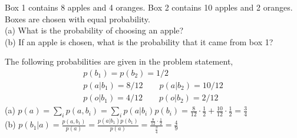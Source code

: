\documentclass[a4paper]{article}
\begin{document}
\begin{ExerciseList}





\Exercise[label={ex:apples-oranges}] Box 1 contains 8 apples and 4 oranges. Box 2 contains 10 apples
and 2 oranges. Boxes are chosen with equal probability.\\
(a) What is the probability of choosing an
apple?\\
(b) If an apple is chosen, what is the probability that it came from box 1?

\Answer[ref={ex:apples-oranges}] The following probabilities are given in the problem statement,
\begin{gather*}
p(b_1)=p(b_2)=1/2\\
p(a|b_1) = 8/12 \qquad p(a|b_2)=10/12\\
p(o|b_1) = 4/12 \qquad p(o|b_2)=2/12
\end{gather*}
(a) $p(a) = \sum_i p(a,b_i) = \sum_i p(a|b_i)p(b_i)=\frac{8}{12}\cdot\frac{1}{2} + \frac{10}{12}\cdot\frac{1}{2} = \frac{3}{4}$\\
(b) $p(b_1|a) = \frac{p(a,b_1)}{p(a)} = \frac{p(a|b_1)p(b_1)}{p(a)} = \frac{\frac{8}{12}\cdot\frac{1}{2}}{\frac{3}{4}} = \frac{4}{9}$





\end{ExerciseList}
\end{document}
